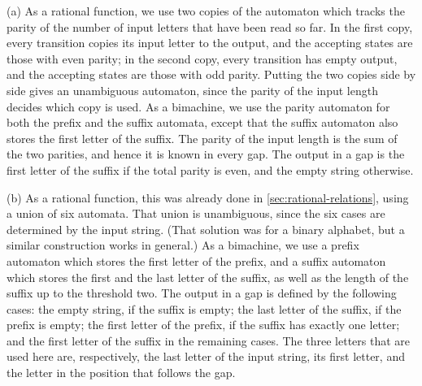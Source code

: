{
    (a) As a rational function, we use two copies of the automaton which tracks the parity of the number of input letters that have been read so far. In the first copy, every transition copies its input letter to the output, and the accepting states are those with even parity; in the second copy, every transition has empty output, and the accepting states are those with odd parity. Putting the two copies side by side gives an unambiguous automaton, since the parity of the input length decides which copy is used. As a bimachine, we use the parity automaton for both the prefix and the suffix automata, except that the suffix automaton also stores the first letter of the suffix. The parity of the input length is the sum of the two parities, and hence it is known in every gap. The output in a gap is the first letter of the suffix if the total parity is even, and the empty string otherwise.

    (b) As a rational function, this was already done in \cref{sec:rational-relations}, using a union of six automata. That union is unambiguous, since the six cases are determined by the input string.  (That solution was for a binary alphabet, but a similar construction works in general.) As a bimachine, we use a prefix automaton which stores the first letter of the prefix, and a suffix automaton which stores the first and the last letter of the suffix, as well as the length of the suffix up to the threshold two. The output in a gap is defined by the following cases: the empty string, if the suffix is empty; the last letter of the suffix, if the prefix is empty; the first letter of the prefix, if the suffix has exactly one letter; and the first letter of the suffix in the remaining cases. The three letters that are used here are, respectively, the last letter of the input string, its first letter, and the letter in the position that follows the gap.

}
